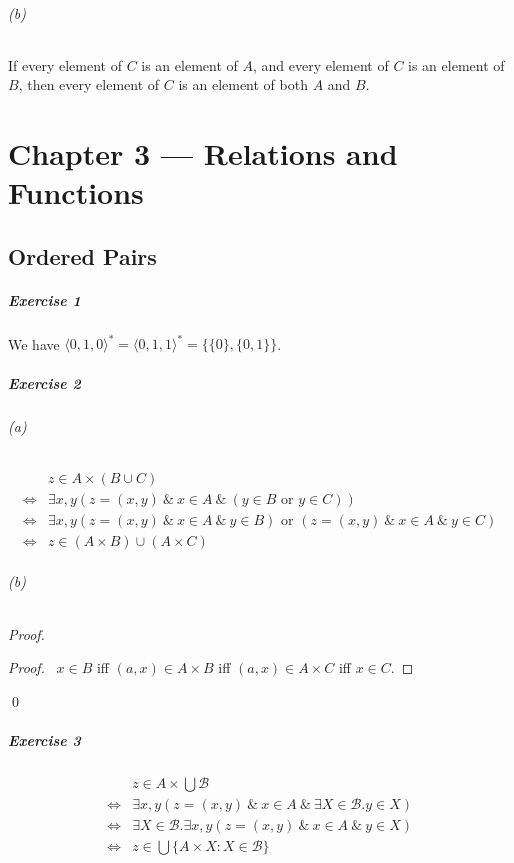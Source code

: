 \documentclass{report}
\begin{document}
    \subparagraph{(b)}
    If every element of $C$ is an element of $A$, and every element of $C$ is an element of $B$,
    then every element of $C$ is an element of both $A$ and $B$.

    \chapter{Chapter 3 --- Relations and Functions}

    \section{Ordered Pairs}

    \paragraph{Exercise 1}
    We have $\langle 0, 1, 0 \rangle^* = \langle 0, 1, 1 \rangle^* = \{ \{ 0 \}, \{ 0,1 \} \}$.

    \paragraph{Exercise 2}
    \subparagraph{(a)}
    \begin{align*}
        & z \in A \times (B \cup C) \\
        \Leftrightarrow & \exists x,y (z = (x,y) \ \&\ x \in A \ \&\ (y \in B \text{ or } y \in C)) \\
        \Leftrightarrow & \exists x,y (z = (x,y)\ \&\ x \in A\ \&\ y \in B) \text{ or }
        (z = (x,y)\ \&\ x \in A\ \&\ y \in C) \\
        \Leftrightarrow & z \in (A \times B) \cup (A \times C)
    \end{align*}
    \subparagraph{(b)}
    \begin{proof}
        \begin{proof}
            \pf\ $x \in B$ iff $(a,x) \in A \times B$ iff $(a,x) \in A \times C$ iff $x \in C$.
        \end{proof}
        \qed
    \end{proof}

    \paragraph{Exercise 3}
    \begin{align*}
        & z \in A \times \bigcup \mathcal{B} \\
        \Leftrightarrow & \exists x,y (z = (x,y)\ \&\ x \in A\ \&\ \exists X \in \mathcal{B}. y \in X) \\
        \Leftrightarrow & \exists X \in \mathcal{B}. \exists x,y (z = (x,y)\ \&\ x \in A\ \&\ y \in X) \\
        \Leftrightarrow & z \in \bigcup \{ A \times X : X \in \mathcal{B} \}
    \end{align*}
\end{document}
